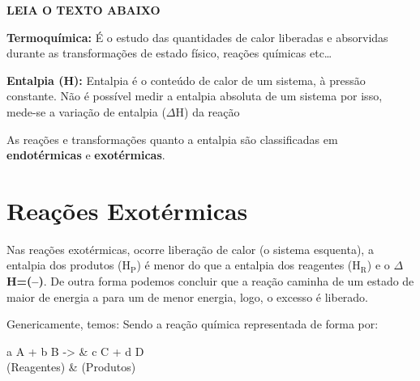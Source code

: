 \documentclass[11pt]{article}
\begin{document}

\begin{multicols}{2}
\textbf{LEIA O TEXTO ABAIXO}

\textbf{Termoquímica:} É o estudo das quantidades de calor liberadas e absorvidas durante as transformações de estado físico, reações químicas etc\ldots{}

\textbf{Entalpia (H):} Entalpia é o conteúdo de calor de um sistema, à pressão constante. Não é possível medir a entalpia absoluta de um sistema por isso, mede-se a variação de entalpia (\(\Delta\)H) da reação

As reações e transformações quanto a entalpia são classificadas em \textbf{endotérmicas} e \textbf{exotérmicas}.

\section{Reações  Exotérmicas}
\label{sec:orgde52bce}
Nas reações exotérmicas, ocorre liberação de calor (o sistema esquenta), a entalpia dos produtos (\(\mathrm{H_P}\)) é menor do que a entalpia dos reagentes (\(\mathrm{H_R}\)) e o  \textbf{\(\Delta\)H=(–)}. De outra forma podemos concluir que a reação caminha de um estado de maior de energia a para um de menor energia, logo, o excesso é liberado.

Genericamente, temos:
Sendo a reação química representada de forma por: 
\begin{reactions*}
a A   +  b B   -> &  c C + d D \\
 (Reagentes)     & \; \;         (Produtos)
\end{reactions*}




\end{multicols}
\end{document}
